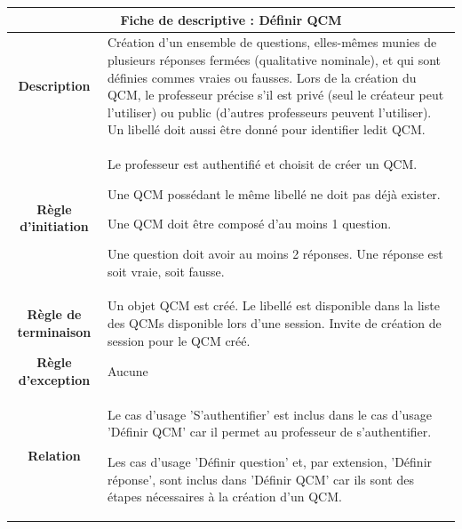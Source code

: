 \documentclass[10pt,a4paper,titlepage]{report}
\begin{document}
	
	\begin{tabular}{|c|p{8cm}|}
	\hline 
	\multicolumn{2}{|c|}{\textbf{Fiche de descriptive : Définir QCM}} \\ 
	\hline 
	\textbf{Description} &Création d'un ensemble de questions, elles-mêmes munies
	de plusieurs réponses fermées 
	(qualitative nominale), et qui sont définies commes vraies ou fausses. Lors de la
	création du QCM,
 le professeur précise s'il est privé (seul le créateur peut l'utiliser)
	ou public (d'autres professeurs peuvent l'utiliser). Un libellé doit aussi être donné
	pour identifier ledit QCM.
 \\  
	\hline
	\textbf{Règle d'initiation} & Le professeur est authentifié et choisit de créer un QCM.

	Une QCM possédant le même libellé ne doit pas déjà exister.

	Une QCM doit être composé d'au moins 1 question.

	Une question doit avoir au moins 2 réponses.
	Une réponse est soit vraie, soit fausse.


 \\ 
	\hline 
	\textbf{Règle de terminaison} & Un objet QCM est créé.
	Le libellé est disponible dans la liste des QCMs disponible lors d'une session.
	Invite de création de session pour le QCM créé.
	 \\ 
	\hline 
	\textbf{Règle d'exception} & Aucune \\ 
	\hline 
	\textbf{Relation} & Le cas d'usage 'S'authentifier' est inclus dans le cas d'usage 'Définir QCM' car il 
	permet au professeur de s'authentifier.

	Les cas d'usage 'Définir question' et, par extension, 'Définir réponse', sont inclus
	dans 'Définir QCM' car ils sont des étapes nécessaires à la création d'un QCM.
 \\ 
	\hline 
	\end{tabular} 
	\newline
	\newline
\end{document}

